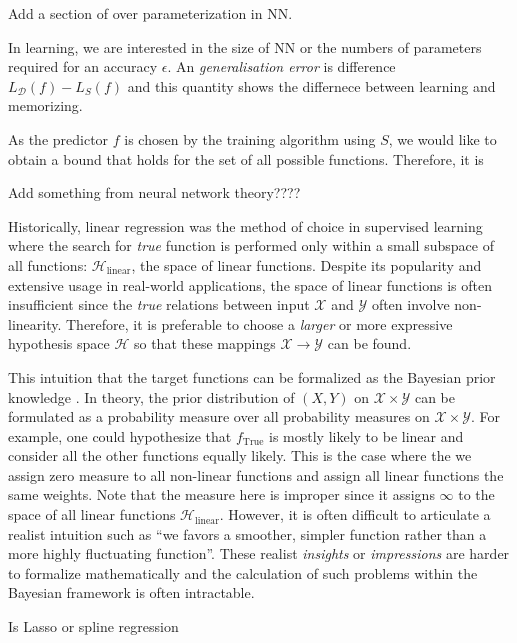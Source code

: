 Add a section of over parameterization in NN.

In learning, we are interested in the size of NN or the numbers of parameters
required for an accuracy $\epsilon$. An \textit{generalisation error} is
difference $L_\mathcal{D}(f) - L_{S}(f)$ and this quantity shows the differnece between learning and memorizing.

As the predictor $f$ is chosen by the training algorithm using $S$, we would
like to obtain a bound that holds for the set of all possible functions.
Therefore, it is 

Add something from neural network theory????

Historically, linear regression \TOCITE was the method of choice in supervised
learning where the search for \textit{true} function is performed only within a
small subspace of all functions: $\mathcal{H}_{\text{linear}}$, the space of
linear functions. Despite its popularity and extensive usage in real-world
applications, the space of linear functions is often insufficient since the
\textit{true} relations between input $\mathcal{X}$ and $\mathcal{Y}$ often
involve non-linearity. Therefore, it is preferable to choose a \textit{larger}
or more expressive hypothesis space $\mathcal{H}$ so that these mappings
$\mathcal{X} \to \mathcal{Y}$ can be found.

This intuition that the target functions can be formalized as the Bayesian prior
knowledge \TOCITE. In theory, the prior distribution of $(X, Y)$ on $\mathcal{X}
\times \mathcal{Y}$ can be formulated as a probability measure over all
probability measures on $\mathcal{X} \times \mathcal{Y}$.  For example, one
could hypothesize that $f_{\text{True}}$ is mostly likely to be linear and
consider all the other functions equally likely. This is the case where the we
assign zero measure to all non-linear functions and assign all linear functions
the same weights. Note that the measure here is improper since it assigns
$\infty$ to the space of all linear functions $\mathcal{H}_{\text{linear}}$.
However, it is often difficult to articulate a realist intuition such as ``we
favors a smoother, simpler function rather than a more highly fluctuating
function''. These realist \textit{insights} or \textit{impressions} are
harder to formalize mathematically and the calculation of such problems within
the Bayesian framework is often intractable.

Is Lasso or spline regression 


